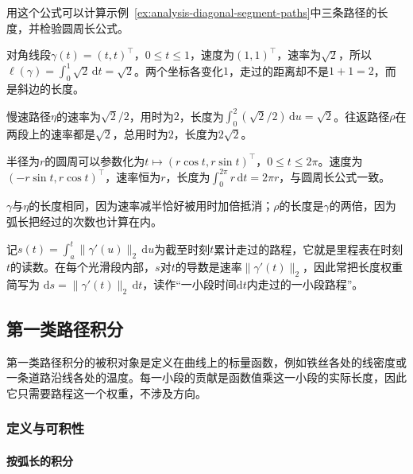 用这个公式可以计算示例~\ref{ex:analysis-diagonal-segment-paths}中三条路径的长度，并检验圆周长公式。
\begin{example}[对角线段与圆周的弧长]
对角线段$\gamma(t)=(t,t)^\top$，$0\leq t\leq1$，速度为$(1,1)^\top$，速率为$\sqrt2$，所以$\ell(\gamma)=\int_0^1\sqrt2\,\mathrm dt=\sqrt2$。两个坐标各变化$1$，走过的距离却不是$1+1=2$，而是斜边的长度。

慢速路径$\eta$的速率为$\sqrt2/2$，用时为$2$，长度为$\int_0^2(\sqrt2/2)\,\mathrm du=\sqrt2$。往返路径$\rho$在两段上的速率都是$\sqrt2$，总用时为$2$，长度为$2\sqrt2$。

半径为$r$的圆周可以参数化为$t\mapsto(r\cos t,r\sin t)^\top$，$0\leq t\leq2\pi$。速度为$(-r\sin t,r\cos t)^\top$，速率恒为$r$，长度为$\int_0^{2\pi}r\,\mathrm dt=2\pi r$，与圆周长公式一致。
\end{example}

$\gamma$与$\eta$的长度相同，因为速率减半恰好被用时加倍抵消；$\rho$的长度是$\gamma$的两倍，因为弧长把经过的次数也计算在内。

记$s(t)=\int_a^t\lVert\gamma'(u)\rVert_2\,\mathrm du$为截至时刻$t$累计走过的路程，它就是里程表在时刻$t$的读数。在每个光滑段内部，$s$对$t$的导数是速率$\lVert\gamma'(t)\rVert_2$，因此常把长度权重简写为
$\mathrm ds=\lVert\gamma'(t)\rVert_2\,\mathrm dt$，读作“一小段时间$\mathrm dt$内走过的一小段路程”。

\subsection{第一类路径积分}

第一类路径积分的被积对象是定义在曲线上的标量函数，例如铁丝各处的线密度或一条道路沿线各处的温度。每一小段的贡献是函数值乘这一小段的实际长度，因此它只需要路程这一个权重，不涉及方向。

\subsubsection{定义与可积性}

\paragraph{按弧长的积分}

